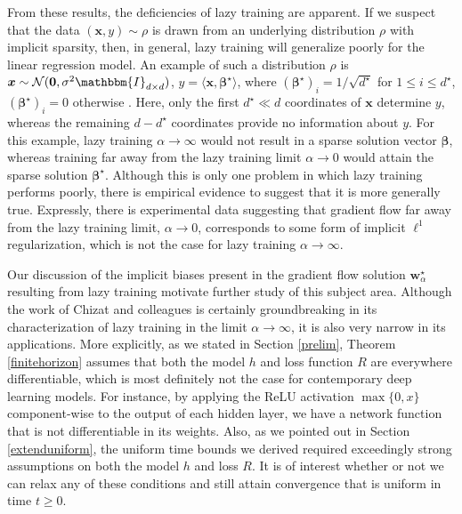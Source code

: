 \documentclass{article}
\begin{document}
From these results, the deficiencies of lazy training are apparent. If we suspect that the data $(\boldsymbol{x}, y) \sim \rho$ is drawn from an underlying distribution $\rho$ with implicit sparsity, then, in general, lazy training will generalize poorly for the linear regression model. An example of such a distribution $\rho$ is $\boldsymbol{x} \sim \mathcal{N}(\boldsymbol{0}, \sigma^2\mathbbm{I}_{d \times d})$, $y = \langle \boldsymbol{x}, \boldsymbol{\beta}^{\star} \rangle$, where $(\boldsymbol{\beta}^{\star})_i = 1/\sqrt{d^{\star}}$ for $1 \leq i \leq d^{\star}$, $(\boldsymbol{\beta}^{\star})_i=0$ otherwise \cite{woodworth2020kernel}. Here, only the first $d^{\star} \ll d$ coordinates of $\boldsymbol{x}$ determine $y$, whereas the remaining $d - d^{\star}$ coordinates provide no information about $y$. For this example, lazy training $\alpha \rightarrow \infty$ would not result in a sparse solution vector $\boldsymbol{\beta}$, whereas training far away from the lazy training limit $\alpha \rightarrow 0$ would attain the sparse solution $\boldsymbol{\beta}^{\star}$. Although this is only one problem in which lazy training performs poorly, there is empirical evidence to suggest that it is more generally true. Expressly, there is experimental data suggesting that gradient flow far away from the lazy training limit, $\alpha \rightarrow 0$, corresponds to some form of implicit $\ell^1$ regularization, which is not the case for lazy training $\alpha \rightarrow \infty$.

Our discussion of the implicit biases present in the gradient flow solution $\boldsymbol{w}_{\alpha}^{\star}$ resulting from lazy training motivate further study of this subject area. Although the work of Chizat and colleagues is certainly groundbreaking in its characterization of lazy training in the limit $\alpha \rightarrow 
\infty$, it is also very narrow in its applications. More explicitly, as we stated in Section \ref{prelim}, Theorem \ref{finitehorizon} assumes that both the model $h$ and loss function $R$ are everywhere differentiable, which is most definitely not the case for contemporary deep learning models. For instance, by applying the ReLU activation $\max\{0, x\}$ component-wise to the output of each hidden layer, we have a network function that is not differentiable in its weights. Also, as we pointed out in Section \ref{extenduniform}, the uniform time bounds we derived required exceedingly strong assumptions on both the model $h$ and loss $R$. It is of interest whether or not we can relax any of these conditions and still attain convergence that is uniform in time $t \geq 0$.
\end{document}
